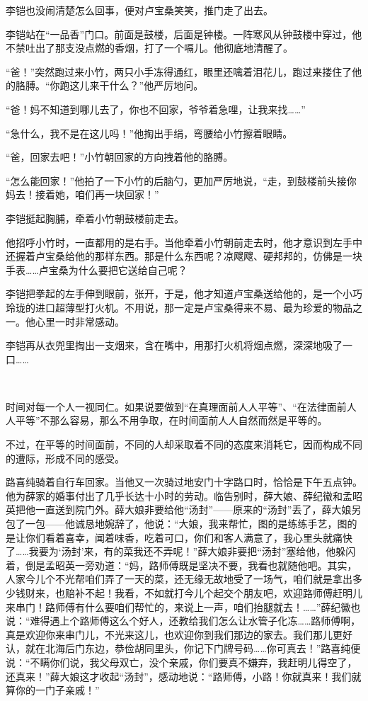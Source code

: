 \par 李铠也没闹清楚怎么回事，便对卢宝桑笑笑，推门走了出去。
\par 李铠站在“一品香”门口。前面是鼓楼，后面是钟楼。一阵寒风从钟鼓楼中穿过，他不禁吐出了那支没点燃的香烟，打了一个嗝儿。他彻底地清醒了。
\par “爸！”突然跑过来小竹，两只小手冻得通红，眼里还噙着泪花儿，跑过来搂住了他的胳膊。“你跑这儿来干什么？”他严厉地问。
\par “爸！妈不知道到哪儿去了，你也不回家，爷爷着急哩，让我来找……”
\par “急什么，我不是在这儿吗！”他掏出手绢，弯腰给小竹擦着眼睛。
\par “爸，回家去吧！”小竹朝回家的方向拽着他的胳膊。
\par “怎么能回家！”他拍了一下小竹的后脑勺，更加严厉地说，“走，到鼓楼前头接你妈去！接着她，咱们再一块回家！”
\par 李铠挺起胸脯，牵着小竹朝鼓楼前走去。
\par 他招呼小竹时，一直都用的是右手。当他牵着小竹朝前走去时，他才意识到左手中还握着卢宝桑给他的那样东西。那是什么东西呢？凉飕飕、硬邦邦的，仿佛是一块手表……卢宝桑为什么要把它送给自己呢？
\par 李铠把拳起的左手伸到眼前，张开，于是，他才知道卢宝桑送给他的，是一个小巧玲珑的进口超薄型打火机。不用说，那一定是卢宝桑得来不易、最为珍爱的物品之一。他心里一时非常感动。
\par 李铠再从衣兜里掏出一支烟来，含在嘴中，用那打火机将烟点燃，深深地吸了一口……
\par  
\par 时间对每一个人一视同仁。如果说要做到“在真理面前人人平等”、“在法律面前人人平等”不那么容易，那么不用争取，在时间面前人人自然而然是平等的。
\par 不过，在平等的时间面前，不同的人却采取着不同的态度来消耗它，因而构成不同的遭际，形成不同的感受。
\par 路喜纯骑着自行车回家。当他又一次骑过地安门十字路口时，恰恰是下午五点钟。他为薛家的婚事付出了几乎长达十小时的劳动。临告别时，薛大娘、薛纪徽和孟昭英把他一直送到院门外。薛大娘非要给他“汤封”——原来的“汤封”丢了，薛大娘另包了一包——他诚恳地婉辞了，他说：“大娘，我来帮忙，图的是练练手艺，图的是让你们看着喜幸，闻着味香，吃着可口，你们和客人满意了，我心里头就痛快了……我要为‘汤封’来，有的菜我还不弄呢！”薛大娘非要把“汤封”塞给他，他躲闪着，倒是孟昭英一旁劝道：“妈，路师傅既是坚决不要，我看也就随他吧。其实，人家今儿个不光帮咱们弄了一天的菜，还无缘无故地受了一场气，咱们就是拿出多少钱财来，也赔补不起！我看，不如就打今儿个起交个朋友吧，欢迎路师傅赶明儿来串门！路师傅有什么要咱们帮忙的，来说上一声，咱们抬腿就去！……”薛纪徽也说：“难得遇上个路师傅这么个好人，还教给我们怎么让水管子化冻……路师傅啊，真是欢迎你来串门儿，不光来这儿，也欢迎你到我们那边的家去。我们那儿更好认，就在北海后门东边，恭俭胡同里头，你记下门牌号码……你可真去！”路喜纯便说：“不瞒你们说，我父母双亡，没个亲戚，你们要真不嫌弃，我赶明儿得空了，还真来！”薛大娘这才收起“汤封”，感动地说：“路师傅，小路！你就真来！我们就算你的一门子亲戚！”
